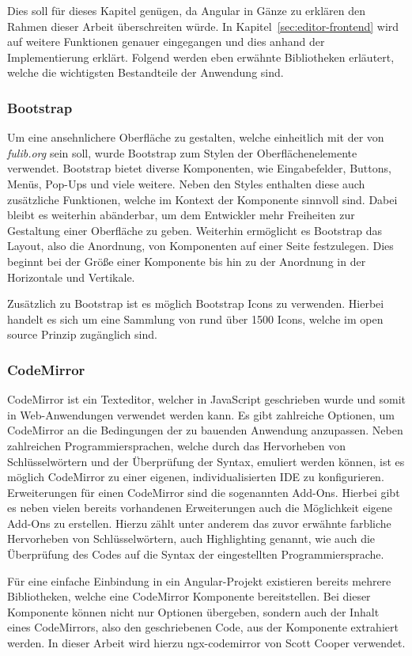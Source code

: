 Dies soll für dieses Kapitel genügen, da Angular in Gänze zu erklären den Rahmen dieser Arbeit überschreiten würde.
In Kapitel~\ref{sec:editor-frontend} wird auf weitere Funktionen genauer eingegangen und dies anhand der Implementierung erklärt.
Folgend werden eben erwähnte Bibliotheken erläutert, welche die wichtigsten Bestandteile der Anwendung sind.

\subsubsection{Bootstrap}
Um eine ansehnlichere Oberfläche zu gestalten, welche einheitlich mit der von \textit{fulib.org} sein soll, wurde Bootstrap zum
Stylen der Oberflächenelemente verwendet.
Bootstrap bietet diverse Komponenten, wie Eingabefelder, Buttons, Menüs, Pop-Ups und viele weitere.
Neben den Styles enthalten diese auch zusätzliche Funktionen, welche im Kontext der Komponente sinnvoll sind.
Dabei bleibt es weiterhin abänderbar, um dem Entwickler mehr Freiheiten zur Gestaltung einer Oberfläche zu geben.
Weiterhin ermöglicht es Bootstrap das Layout, also die Anordnung, von Komponenten auf einer Seite festzulegen.
Dies beginnt bei der Größe einer Komponente bis hin zu der Anordnung in der Horizontale und Vertikale.\cite*{bs}

Zusätzlich zu Bootstrap ist es möglich Bootstrap Icons zu verwenden.
Hierbei handelt es sich um eine Sammlung von rund über 1500 Icons, welche im open source Prinzip zugänglich sind.\cite*{bsIcons}

\subsubsection{CodeMirror}
CodeMirror ist ein Texteditor, welcher in JavaScript geschrieben wurde und somit in Web-Anwendungen verwendet werden kann.
Es gibt zahlreiche Optionen, um CodeMirror an die Bedingungen der zu bauenden Anwendung anzupassen.
Neben zahlreichen Programmiersprachen, welche durch das Hervorheben von Schlüsselwörtern und der Überprüfung der Syntax, emuliert werden können,
ist es möglich CodeMirror zu einer eigenen, individualisierten IDE zu konfigurieren.
Erweiterungen für einen CodeMirror sind die sogenannten Add-Ons.
Hierbei gibt es neben vielen bereits vorhandenen Erweiterungen auch die Möglichkeit eigene Add-Ons zu erstellen.
Hierzu zählt unter anderem das zuvor erwähnte farbliche Hervorheben von Schlüsselwörtern, auch Highlighting genannt, wie auch die
Überprüfung des Codes auf die Syntax der eingestellten Programmiersprache.\cite*{cm}

Für eine einfache Einbindung in ein Angular-Projekt existieren bereits mehrere Bibliotheken, welche eine CodeMirror Komponente bereitstellen.
Bei dieser Komponente können nicht nur Optionen übergeben, sondern auch der Inhalt eines CodeMirrors, also den geschriebenen Code, aus der Komponente
extrahiert werden.
In dieser Arbeit wird hierzu ngx-codemirror von Scott Cooper verwendet.\cite*{ngxcm}
